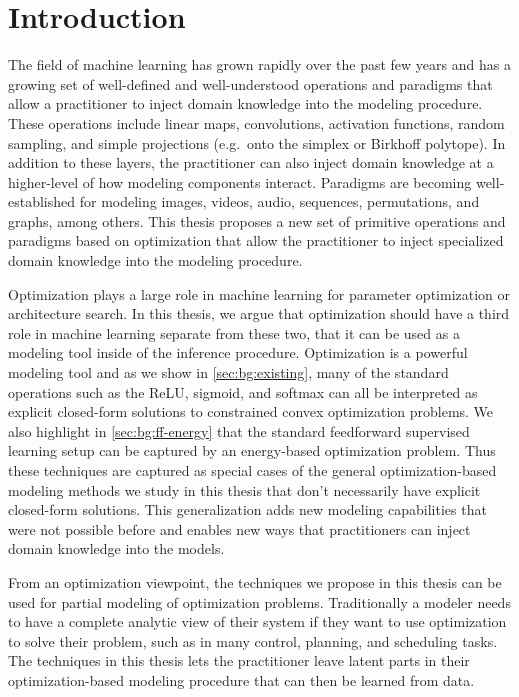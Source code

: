 \chapter{Introduction}
The field of machine learning has grown rapidly over the past few
years and has a growing set of well-defined and
well-understood operations and paradigms that allow
a practitioner to inject domain
knowledge into the modeling procedure.
These operations include linear maps, convolutions,
activation functions, random sampling, and
simple projections (e.g.~onto the simplex or Birkhoff polytope).
In addition to these layers, the practitioner can also
inject domain knowledge at a higher-level of
how modeling components interact.
Paradigms are becoming well-established for modeling
images, videos, audio, sequences, permutations, and graphs,
among others.
This thesis proposes a new set of primitive operations and
paradigms based on optimization that allow the practitioner
to inject specialized domain knowledge into the modeling procedure.

Optimization plays a large role in machine learning for
parameter optimization or architecture search.
In this thesis, we argue that optimization should have a third
role in machine learning separate from these two,
that it can be used as a modeling tool inside of
the inference procedure.
Optimization is a powerful modeling tool and as we show in
\cref{sec:bg:existing}, many of the standard operations such
as the ReLU, sigmoid, and softmax can all be interpreted
as explicit closed-form solutions to constrained convex
optimization problems.
We also highlight in \cref{sec:bg:ff-energy} that the standard
feedforward supervised learning setup can be captured
by an energy-based optimization problem.
Thus these techniques are captured as special cases of the
general optimization-based modeling methods we study in
this thesis that don't necessarily have explicit
closed-form solutions.
This generalization adds new modeling capabilities that
were not possible before and enables new ways that
practitioners can inject domain knowledge into the models.

From an optimization viewpoint, the techniques we propose
in this thesis can be used for partial modeling of
optimization problems.
Traditionally a modeler needs to have a complete analytic view
of their system if they want to use optimization to solve
their problem, such as in many control, planning, and scheduling tasks.
The techniques in this thesis lets the practitioner
leave latent parts in their optimization-based modeling
procedure that can then be learned from data.

